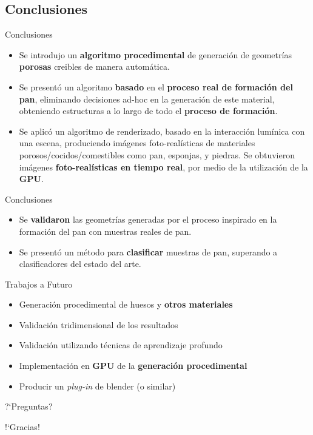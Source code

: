 \documentclass[spanish,unknownkeysallowed,10pt]{beamer}
\begin{document}
\subsection{Conclusiones}
\begin{frame}{Conclusiones}
\begin{block}{}
\begin{itemize}
\item Se introdujo un \textbf{algoritmo procedimental} de generación de geometrías \textbf{porosas} creibles de manera automática.
\item Se presentó un algoritmo \textbf{basado} en el \textbf{proceso real de formación del pan}, eliminando decisiones ad-hoc en la generación de este material, obteniendo estructuras a lo largo de todo el \textbf{proceso de formación}.
\item Se aplicó un algoritmo de renderizado, basado en la interacción lumínica con una escena, produciendo imágenes foto-realísticas de materiales porosos/cocidos/comestibles como pan, esponjas, y piedras. Se obtuvieron imágenes \textbf{foto-realísticas en tiempo real}, por medio de la utilización de la \textbf{GPU}.
\end{itemize}
\end{block}
\end{frame}

\begin{frame}{Conclusiones}
\begin{block}{}
\begin{itemize}
\item Se \textbf{validaron} las geometrías generadas por el proceso inspirado en la formación del pan con muestras reales de pan.
\item Se presentó un método para \textbf{clasificar} muestras de pan, superando a clasificadores del estado del arte.
\end{itemize}
\end{block}

\begin{block}{Trabajos a Futuro}
\begin{itemize}
\item Generación procedimental de huesos y \textbf{otros materiales}
\item Validación tridimensional de los resultados
\item Validación utilizando técnicas de aprendizaje profundo
\item Implementación en \textbf{GPU} de la \textbf{generación procedimental}
\item Producir un {\it plug-in} de blender (o similar)
\end{itemize}
\end{block}
\end{frame}

\begin{frame}
\centering

?`Preguntas?

\end{frame}

\begin{frame}
\centering

!`Gracias!

\end{frame}
\end{document}
